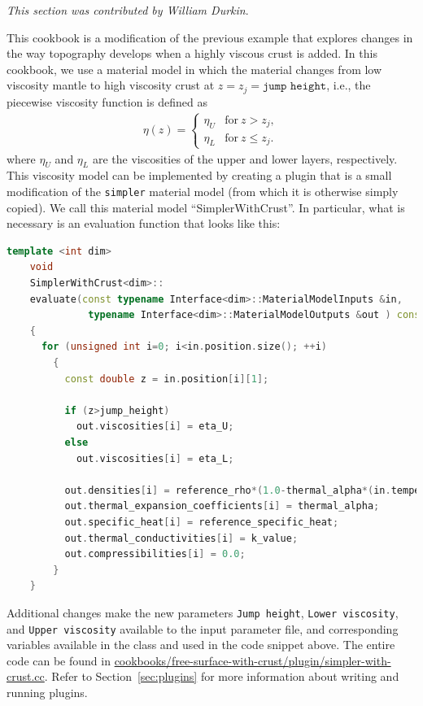 \documentclass{article}
\begin{document}
\textit{This section was contributed by William Durkin}.

This cookbook is a modification of the previous example that explores changes in the way topography develops when a 
highly viscous crust is added.  
In this cookbook, we use a material model in which the material changes from low
viscosity mantle to high viscosity crust at $z = z_j = \texttt{jump height}$,
i.e., the piecewise viscosity function is defined as
\begin{align*}
  \eta(z) = \left\{
    \begin{matrix}
      \eta_U & \text{for}\ z > z_j, \\
      \eta_L & \text{for}\ z  \le z_j.
    \end{matrix}
  \right.
\end{align*}
where $\eta_U$ and $\eta_L$ are the viscosities of the upper and lower layers,
respectively. This viscosity model can be implemented by creating a plugin that
is a small modification of the \texttt{simpler} material model (from which it
is otherwise simply copied). We call this material model ``SimplerWithCrust''.
In particular, what is necessary is an evaluation function that looks like this:
\begin{lstlisting}[frame=single,language=C++] 
    template <int dim>
    void
    SimplerWithCrust<dim>::
    evaluate(const typename Interface<dim>::MaterialModelInputs &in, 
              typename Interface<dim>::MaterialModelOutputs &out ) const
    {
      for (unsigned int i=0; i<in.position.size(); ++i)
        { 
          const double z = in.position[i][1];

          if (z>jump_height)
            out.viscosities[i] = eta_U;
          else
            out.viscosities[i] = eta_L;
                     
          out.densities[i] = reference_rho*(1.0-thermal_alpha*(in.temperature[i]-reference_T));
          out.thermal_expansion_coefficients[i] = thermal_alpha;
          out.specific_heat[i] = reference_specific_heat;
          out.thermal_conductivities[i] = k_value;
          out.compressibilities[i] = 0.0;
        }
    }
\end{lstlisting}
Additional changes make the new parameters \texttt{Jump height}, \texttt{Lower
viscosity}, and \texttt{Upper viscosity} available to the input parameter file,
and corresponding variables available in the class and used in the code snippet
above. The entire code can be found in
\url{cookbooks/free-surface-with-crust/plugin/simpler-with-crust.cc}. Refer to
Section~\ref{sec:plugins} for more information about writing and running
plugins.
\end{document}
